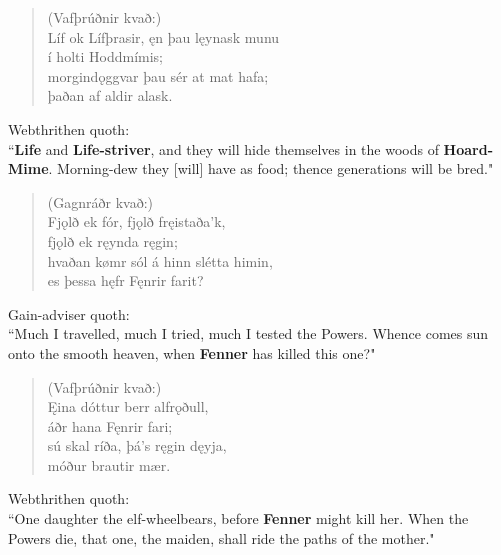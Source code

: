 \begin{verse}
(Vafþrúðnir kvað:) \\%
\bva Líf ok Lífþrasir, \hld ęn þau lęynask munu \\%
\ind í holti Hoddmímis; \\%
morgindǫggvar \hld þau sér at mat hafa; \\%
\ind þaðan af aldir alask.\\%
\end{verse}

\bvb Webthrithen quoth: \\ “\textbf{Life} and \textbf{Life-striver}, and they will hide themselves in the woods of \textbf{Hoard-Mime}\footnotemark[85]. Morning-dew they [will] have as food; thence generations will be bred." \\

\begin{verse}
(Gagnráðr kvað:) \\%
\bva Fjǫlð ek fór, \hld fjǫlð fręistaða'k, \\%
\ind fjǫlð ek ręynda ręgin; \\%
hvaðan kømr sól \hld á hinn slétta himin, \\%
\ind es þessa hęfr Fęnrir farit?\\%
\end{verse}

\bvb Gain-adviser quoth: \\ “Much I travelled, much I tried, much I tested the Powers. Whence comes sun onto the smooth heaven, when \textbf{Fenner} has killed this one\footnotemark[90]?" \\

\begin{verse}
(Vafþrúðnir kvað:) \\%
\bva Ęina dóttur \hld berr alfrǫðull, \\%
\ind áðr hana Fęnrir fari; \\%
sú skal ríða, \hld þá's ręgin dęyja, \\%
\ind móður brautir mær.\\%
\end{verse}

\bvb Webthrithen quoth: \\ “One daughter the elf-wheel\footnotemark[95] bears, before \textbf{Fenner} might kill her. When the Powers die, that one, the maiden, shall ride the paths of the mother." \\


